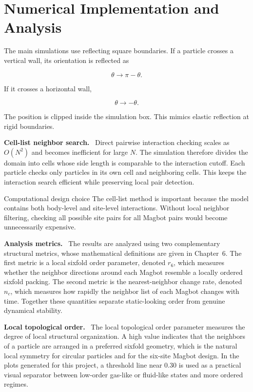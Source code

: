 \documentclass[12pt,a4paper,oneside]{report}
\newcommand{\runin}[1]{\vspace{0.45em}\noindent\textbf{#1.}\ }
\begin{document}
\section{Numerical Implementation and Analysis}
The main simulations use reflecting square boundaries. If a particle crosses a vertical wall, its orientation is reflected as

\begin{equation}
\theta \rightarrow \pi-\theta.
\end{equation}

If it crosses a horizontal wall,

\begin{equation}
\theta \rightarrow -\theta.
\end{equation}

The position is clipped inside the simulation box. This mimics elastic reflection at rigid boundaries.

\runin{Cell-list neighbor search}
Direct pairwise interaction checking scales as $O(N^2)$ and becomes inefficient for large $N$. The simulation therefore divides the domain into cells whose side length is comparable to the interaction cutoff. Each particle checks only particles in its own cell and neighboring cells. This keeps the interaction search efficient while preserving local pair detection.

\begin{keybox}{Computational design choice}
The cell-list method is important because the model contains both body-level and site-level interactions. Without local neighbor filtering, checking all possible site pairs for all Magbot pairs would become unnecessarily expensive.
\end{keybox}

\runin{Analysis metrics}
The results are analyzed using two complementary structural metrics, whose mathematical definitions are given in Chapter~6. The first metric is a local sixfold order parameter, denoted $r_6$, which measures whether the neighbor directions around each Magbot resemble a locally ordered sixfold packing. The second metric is the nearest-neighbor change rate, denoted $n_c$, which measures how rapidly the neighbor list of each Magbot changes with time. Together these quantities separate static-looking order from genuine dynamical stability.

\runin{Local topological order}
The local topological order parameter measures the degree of local structural organization. A high value indicates that the neighbors of a particle are arranged in a preferred sixfold geometry, which is the natural local symmetry for circular particles and for the six-site Magbot design. In the plots generated for this project, a threshold line near $0.30$ is used as a practical visual separator between low-order gas-like or fluid-like states and more ordered regimes.
\end{document}
